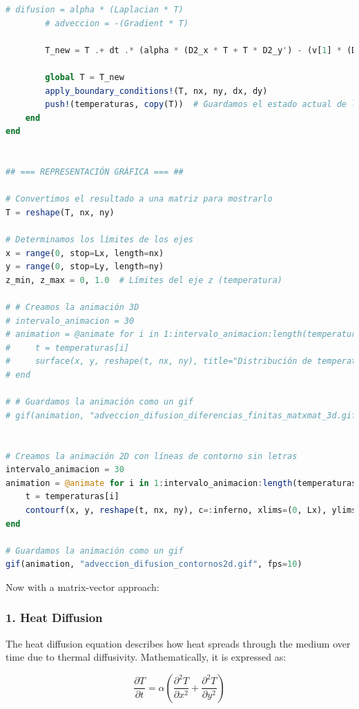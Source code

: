 \begin{lstlisting}[language=Julia]
        # difusion = alpha * (Laplacian * T)
        # adveccion = -(Gradient * T)

        T_new = T .+ dt .* (alpha * (D2_x * T + T * D2_y') - (v[1] * (D_x * T) + v[2] * (T * D_y')))
        
        global T = T_new
        apply_boundary_conditions!(T, nx, ny, dx, dy)
        push!(temperaturas, copy(T))  # Guardamos el estado actual de la temperatura
    end
end


## === REPRESENTACIÓN GRÁFICA === ##

# Convertimos el resultado a una matriz para mostrarlo
T = reshape(T, nx, ny)

# Determinamos los límites de los ejes
x = range(0, stop=Lx, length=nx)
y = range(0, stop=Ly, length=ny)
z_min, z_max = 0, 1.0  # Límites del eje z (temperatura)

# # Creamos la animación 3D
# intervalo_animacion = 30
# animation = @animate for i in 1:intervalo_animacion:length(temperaturas)
#     t = temperaturas[i]
#     surface(x, y, reshape(t, nx, ny), title="Distribución de temperatura [M][M]", xlabel="x", ylabel="y", zlabel="Temperatura", c=:inferno, xlims=(0, Lx), ylims=(0, Ly), zlims=(z_min, z_max))
# end

# # Guardamos la animación como un gif
# gif(animation, "adveccion_difusion_diferencias_finitas_matxmat_3d.gif", fps=30)


# Creamos la animación 2D con líneas de contorno sin letras
intervalo_animacion = 30
animation = @animate for i in 1:intervalo_animacion:length(temperaturas)
    t = temperaturas[i]
    contourf(x, y, reshape(t, nx, ny), c=:inferno, xlims=(0, Lx), ylims=(0, Ly), zlims=(z_min, z_max), xlabel="", ylabel="", title="", clabels=false)
end

# Guardamos la animación como un gif
gif(animation, "adveccion_difusion_contornos2d.gif", fps=10)
\end{lstlisting}

Now with a matrix-vector approach:



\subsubsection*{1. Heat Diffusion}
The heat diffusion equation describes how heat spreads through the medium over time due to thermal diffusivity. Mathematically, it is expressed as:

\[
\frac{\partial T}{\partial t} = \alpha \left( \frac{\partial^2 T}{\partial x^2} + \frac{\partial^2 T}{\partial y^2} \right)
\]

